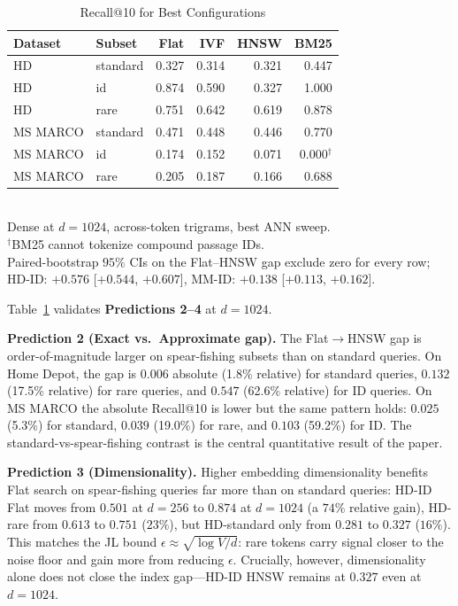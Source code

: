 \documentclass[conference]{IEEEtran}
\begin{document}
\begin{table}[t]
\centering
\small
\caption{Recall@10 for Best Configurations}
\label{tab:detailed-results}
\setlength{\tabcolsep}{4pt}
\begin{tabular}{llrrrr}
\toprule
\textbf{Dataset} & \textbf{Subset} & \textbf{Flat} & \textbf{IVF} & \textbf{HNSW} & \textbf{BM25} \\
\midrule
HD       & standard & 0.327 & 0.314 & 0.321 & 0.447 \\
HD       & id       & 0.874 & 0.590 & 0.327 & 1.000 \\
HD       & rare     & 0.751 & 0.642 & 0.619 & 0.878 \\
\midrule
MS MARCO & standard & 0.471 & 0.448 & 0.446 & 0.770 \\
MS MARCO & id       & 0.174 & 0.152 & 0.071 & 0.000$^{\dagger}$ \\
MS MARCO & rare     & 0.205 & 0.187 & 0.166 & 0.688 \\
\bottomrule
\end{tabular}
\\[2pt]
{\footnotesize Dense at $d{=}1024$, across-token trigrams, best ANN sweep.\\
$^{\dagger}$BM25 cannot tokenize compound passage IDs.\\
Paired-bootstrap $95\%$ CIs on the Flat--HNSW gap exclude zero for every row; HD-ID: $+0.576$ [$+0.544$, $+0.607$], MM-ID: $+0.138$ [$+0.113$, $+0.162$].}
\end{table}

Table~\ref{tab:detailed-results} validates \textbf{Predictions 2--4} at $d{=}1024$.

\textbf{Prediction 2 (Exact vs.\ Approximate gap).} The Flat$\to$HNSW gap is order-of-magnitude larger on spear-fishing subsets than on standard queries. On Home Depot, the gap is $0.006$ absolute (1.8\% relative) for standard queries, $0.132$ (17.5\% relative) for rare queries, and $0.547$ (62.6\% relative) for ID queries. On MS MARCO the absolute Recall@10 is lower but the same pattern holds: $0.025$ (5.3\%) for standard, $0.039$ (19.0\%) for rare, and $0.103$ (59.2\%) for ID. The standard-vs-spear-fishing contrast is the central quantitative result of the paper.

\textbf{Prediction 3 (Dimensionality).} Higher embedding dimensionality benefits Flat search on spear-fishing queries far more than on standard queries: HD-ID Flat moves from $0.501$ at $d{=}256$ to $0.874$ at $d{=}1024$ (a $74\%$ relative gain), HD-rare from $0.613$ to $0.751$ ($23\%$), but HD-standard only from $0.281$ to $0.327$ ($16\%$). This matches the JL bound $\epsilon\!\approx\!\sqrt{\log V / d}$: rare tokens carry signal closer to the noise floor and gain more from reducing $\epsilon$. Crucially, however, dimensionality alone does not close the index gap---HD-ID HNSW remains at $0.327$ even at $d{=}1024$.
\end{document}
